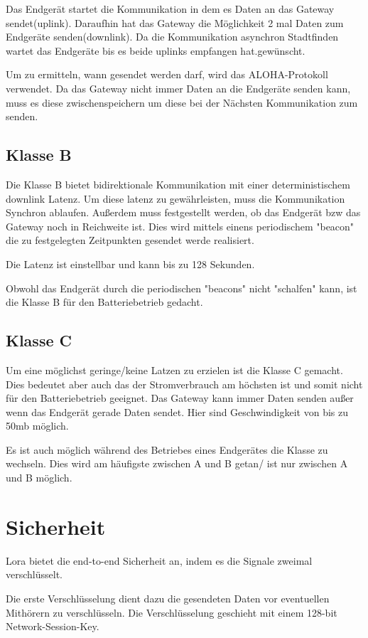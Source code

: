 \documentclass[a4paper,12pt]{article}
\begin{document}
    Das Endgerät startet die Kommunikation in dem es Daten an das Gateway sendet(uplink). Daraufhin hat das Gateway die Möglichkeit 2 mal Daten zum Endgeräte senden(downlink). Da die Kommunikation asynchron Stadtfinden wartet das Endgeräte bis es beide uplinks empfangen hat.gewünscht.
    
    Um zu ermitteln, wann gesendet werden darf, wird das ALOHA-Protokoll verwendet.
    Da das Gateway nicht immer Daten an die Endgeräte senden kann, muss es diese zwischenspeichern um diese bei der Nächsten Kommunikation zum senden.
    \subsection{Klasse B}
    Die Klasse B bietet bidirektionale Kommunikation mit einer deterministischem downlink Latenz. Um diese latenz zu gewährleisten, muss die Kommunikation Synchron ablaufen. Außerdem muss festgestellt werden, ob das Endgerät bzw das Gateway noch in Reichweite ist. Dies wird mittels einens periodischem "beacon" die zu festgelegten
    Zeitpunkten gesendet werde realisiert.

    Die Latenz ist einstellbar und kann bis zu 128 Sekunden.

    Obwohl das Endgerät durch die periodischen "beacons" nicht "schalfen" kann, ist die Klasse B für den Batteriebetrieb gedacht.
    \subsection{Klasse C}
    Um eine möglichst geringe/keine Latzen zu erzielen ist die Klasse C gemacht. Dies bedeutet aber auch das der Stromverbrauch am höchsten ist und somit nicht für den Batteriebetrieb geeignet.
    Das Gateway kann immer Daten senden außer wenn das Endgerät gerade Daten sendet. Hier sind Geschwindigkeit von bis zu 50mb möglich.

    Es ist auch möglich während des Betriebes eines Endgerätes die Klasse zu wechseln. Dies wird am häufigste zwischen A und B getan/ ist nur zwischen A und B möglich.
    \section{Sicherheit}
    Lora bietet die end-to-end Sicherheit an, indem es die Signale zweimal verschlüsselt.

    Die erste Verschlüsselung dient dazu die gesendeten Daten vor eventuellen Mithörern zu verschlüsseln. Die Verschlüsselung geschieht mit einem 128-bit Network-Session-Key.
\end{document}
